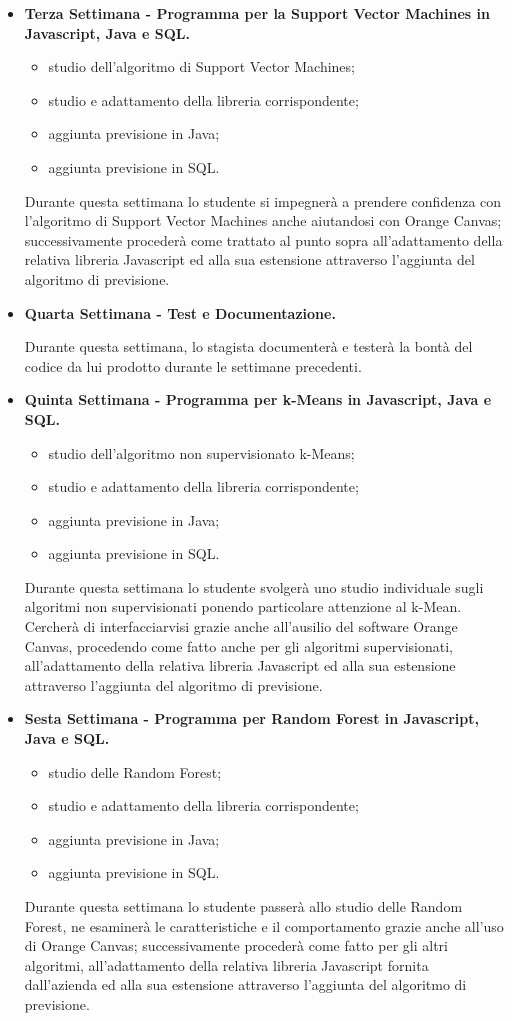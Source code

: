 \begin{itemize}
\item \textbf{Terza Settimana - Programma per la Support Vector Machines in Javascript, Java e SQL.}
	\begin{itemize}
	\item studio dell'algoritmo di Support Vector Machines;
	\item studio e adattamento della libreria corrispondente;
	\item aggiunta previsione in Java; 
	\item aggiunta previsione in SQL.
	\end{itemize}
	Durante questa settimana lo studente si impegnerà a prendere confidenza con l'algoritmo di Support Vector Machines anche aiutandosi con Orange Canvas; successivamente procederà come trattato al punto sopra all'adattamento della relativa libreria Javascript ed alla sua estensione attraverso l'aggiunta del algoritmo di previsione.


\item \textbf{Quarta Settimana - Test e Documentazione.}
	\par Durante questa settimana, lo stagista documenterà e testerà la bontà del codice da lui prodotto durante le settimane precedenti.

\item \textbf{Quinta Settimana - Programma per k-Means in Javascript, Java e SQL.}
\begin{itemize}
	\item studio dell'algoritmo non supervisionato k-Means;
	\item studio e adattamento della libreria corrispondente;
	\item aggiunta previsione in Java;
	\item aggiunta previsione in SQL.
	\end{itemize}
	Durante questa settimana lo studente svolgerà uno studio individuale sugli algoritmi non supervisionati ponendo particolare attenzione al k-Mean. Cercherà di interfacciarvisi grazie anche all'ausilio del software Orange Canvas, procedendo come fatto anche per gli algoritmi supervisionati, all'adattamento della relativa libreria Javascript ed alla sua estensione attraverso l'aggiunta del algoritmo di previsione.
	
	
\item \textbf{Sesta Settimana - Programma per Random Forest in Javascript, Java e SQL.}
\begin{itemize}
	\item studio delle Random Forest;
	\item studio e adattamento della libreria corrispondente;
	\item aggiunta previsione in Java;
	\item aggiunta previsione in SQL.
	\end{itemize}
	Durante questa settimana lo studente passerà allo studio delle Random Forest, ne esaminerà le caratteristiche e il comportamento grazie anche all'uso di Orange Canvas; successivamente procederà come fatto per gli altri algoritmi, all'adattamento della relativa libreria Javascript fornita dall'azienda ed alla sua estensione attraverso l'aggiunta del algoritmo di previsione.
	

\end{itemize}
